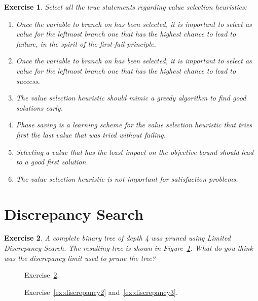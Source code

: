 \documentclass{article}
\newtheorem{exercise}{Exercise}[section]
\begin{document}
    \begin{exercise}
        Select all the true statements regarding value selection heuristics:
        \begin{enumerate}
            \item Once the variable to branch on has been selected, it is important to select as value for the leftmost branch one that has the highest chance to lead to failure, in the spirit of the first-fail principle. %
            \item Once the variable to branch on has been selected, it is important to select as value for the leftmost branch one that has the highest chance to lead to success. %
            \item The value selection heuristic should mimic a greedy algorithm to find good solutions early. %
            \item Phase saving is a learning scheme for the value selection heuristic that tries first the last value that was tried without failing. %
            \item Selecting a value that has the least impact on the objective bound should lead to a good first solution. %
            \item The value selection heuristic is not important for satisfaction problems. %
        \end{enumerate}
        \label{ex:value_heuristics}
    \end{exercise}

    \section{Discrepancy Search}

    \begin{exercise}
        A complete binary tree of depth 4 was pruned using Limited Discrepancy Search.
        The resulting tree is shown in Figure~\ref{fig:discrepancy1}.
        What do you think was the discrepancy limit used to prune the tree?
        \label{ex:discrepancy1}
    \end{exercise}

    \begin{figure}[htbp]
        \centering
        
        \caption{Exercise~\ref{ex:discrepancy1}.}
        \label{fig:discrepancy1}
    \end{figure}

    \begin{figure}[htbp]
        \centering
        
        \caption{Exercise~\ref{ex:discrepancy2} and~\ref{ex:discrepancy3}.}
        \label{fig:discrepancy2}
    \end{figure}
\end{document}
